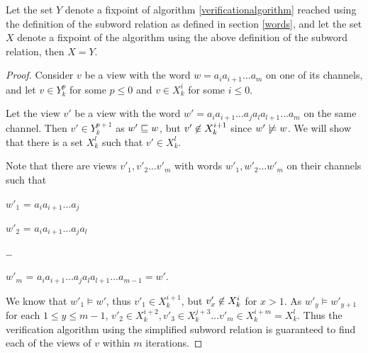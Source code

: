\begin{lemma}
Let the set $Y$ denote a fixpoint of algorithm \ref{verificationalgorithm} reached using the definition of the subword relation as defined in section \ref{words}, and let the set $X$ denote a fixpoint of the algorithm using the above definition of the subword relation, then $X=Y$.
\end{lemma}
\begin{proof}
Consider $v$ be a view with the word $w = a_ia_{i+1}\ldots a_m$ on one of its channels, and let $v\in Y_k^p$ for some $p \leq 0$ and $v\in X_k^i$ for some $i \leq 0$.

Let the view $v'$ be a view with the word $w' = a_ia_{i+1}\ldots a_ja_la_{l+1}\ldots a_m$ on the same channel. Then $v' \in Y_k^{p+1}$ as $w' \sqsubseteq w$, but $v' \centernot\in X_k^{i+1}$ since $w' \centernot\models w$. We will show that there is a set $X_k^l$ such that $v'\in X_k^l$.


Note that there are views $v'_1, v'_2\ldots v'_m$ with words $w'_1, w'_2\ldots w'_m$ on their channels such that

\hspace{10mm}
$w'_1$ =  $a_ia_{i+1}\ldots a_j$

\hspace{10mm}
$w'_2$ = $a_ia_{i+1}\ldots a_ja_l$

\hspace{10mm}
\ldots

\hspace{10mm}
$w'_{m}$ = $a_ia_{i+1}\ldots a_ja_la_{l+1}\ldots a_{m-1} = w'$.

We know that $w'_1 \models w'$, thus $v'_1 \in X_k^{i+1}$, but $v'_x \centernot\in X_k^i$ for $x > 1$. As $w'_y \models w'_{y+1}$ for each $1 \leq y \leq m-1$, $v'_2 \in X_k^{i+2}, v'_3 \in X_k^{j+3} \ldots v'_m \in X_k^{i+m} = X_k^l$. Thus the verification algorithm using the simplified subword relation is guaranteed to find each of the views of $v$ within $m$ iterations.

\end{proof}


